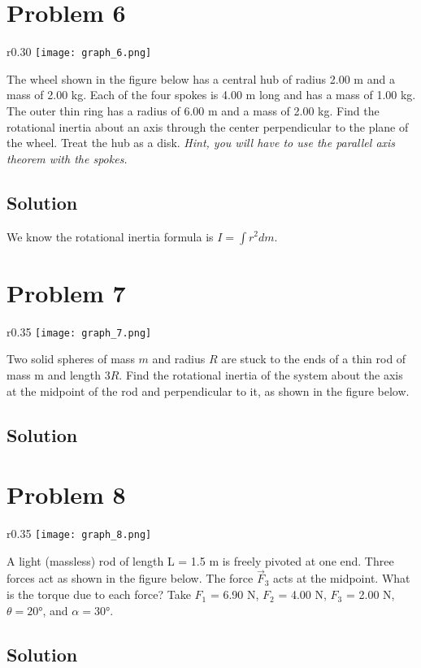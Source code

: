 \documentclass[12pt]{article}
\begin{document}
\pagebreak
\section*{Problem 6}
\begin{wrapfigure}{r}{0.30\textwidth}
    \vspace{-30pt}
    \texttt{[image: graph\_6.png]} 
\end{wrapfigure}
The wheel shown in the figure below has a central hub of radius 2.00 m and a mass of 2.00
kg. Each of the four spokes is 4.00 m long and has a mass of 1.00 kg. The outer thin ring has a
radius of 6.00 m and a mass of 2.00 kg. Find the rotational inertia about an axis through the
center perpendicular to the plane of the wheel. Treat the hub as a disk. \textit{Hint, you will have to
use the parallel axis theorem with the spokes.}

\subsection*{Solution}
We know the rotational inertia formula is \(I = \int r^2 dm\).


\pagebreak
\section*{Problem 7}
\begin{wrapfigure}{r}{0.35\textwidth}
    \vspace{-30pt}
    \texttt{[image: graph\_7.png]} 
\end{wrapfigure}
Two solid spheres of mass $m$ and radius $R$ are stuck to the ends of a thin rod of mass m and
length $3R$. Find the rotational inertia of the system about the axis at the midpoint of the rod and
perpendicular to it, as shown in the figure below.

\subsection*{Solution}


\pagebreak
\section*{Problem 8}
\begin{wrapfigure}{r}{0.35\textwidth}
    \vspace{-30pt}
    \texttt{[image: graph\_8.png]} 
\end{wrapfigure}
A light (massless) rod of length L = 1.5 m is freely pivoted at one end. Three forces act as
shown in the figure below. The force $\vec{F}_3$ acts at the midpoint. What is the torque due to each force?
Take $F_1$ = 6.90 N, $F_2$ = 4.00 N, $F_3$ = 2.00 N, $\theta = 20\unit{\degree}$, and $\alpha = 30\unit{\degree}$.

\subsection*{Solution}
 
\end{document}
